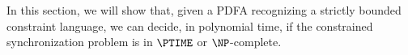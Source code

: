  In this section, we will show that, given a PDFA recognizing a strictly bounded
 constraint language, we can decide, in polynomial time, if
 the constrained synchronization problem is in $\PTIME$
 or $\NP$-complete.
\begin{comment}
 In Proposition~\ref{prop:stricly_bounded_np_hard}
 and in Proposition~\ref{prop:stricly_bounded_P}, it was assumed
 that the unary languages of the form $A_j^{(i)} \subseteq \{a_j\}^*$
 for $j \in \{1,\ldots, k\}$ and $i \in \{1,\ldots,n\}$
 where recognizable by automata with a single final state.
 In the $\NP$-hardness reduction, this assumption was actually used,
 but Proposition~\ref{prop:stricly_bounded_P} could also  
 reformulated and proved without it. In the decision procedure,
 we do not bother to compute such a form, but only any form like
 in Theorem~\ref{thm:bounded_regular_form} for strictly bounded languages.
 This is justified by the next result.
 
 \begin{lemma} %
 \label{lem:form_unitary_or_not}
  Let $\Sigma = \{a_1, \ldots, a_k\}$ be an alphabet of size $k$
  and $L \subseteq a_1^* \cdots a_k^*$.
  If we can write 
  \[
   L = \bigcup_{i=1}^n A_1^{(i)} \cdots A_k^{(i)}
  \]
  with regular, non-empty $A_j^{(i)} \subseteq \{a_j\}^*$
  for $j \in \{1,\ldots,k\}$ and $i \in \{1,\ldots,n\}$
  such that there exists ... prop
  
  then, we can also write in as aunion with single state
  
  The same holds for the condition formulated in Proposition~\ref{prop:stricly_bounded_P}.
 \end{lemma}
\begin{proof}
 Notation as in the statement.
 By Lemma~\ref{lem::unary_single_final}, we can write each
 $A_j^{(i)}$ as a finite union of regular languages recognizable
 by an automaton with a single final state.
 So, if any $A_j^{(i)}$ is infinite, at least one part of this
 union must also be finite, and the same if $A_j^{(i)} \ne  \{\varepsilon\}$.
 Then, rewriting by using that concatenation
 distributes over union, we have a form fulfilling the condition
 of Proposition~\ref{prop:stricly_bounded_np_hard}.
 The same reasoning applies to the condition
 formulated in Proposition~\ref{prop:stricly_bounded_P}.
\end{proof}
 
 
 Note a subtle issue here, and that is the reason why Lemma~\ref{lem:form_unitary_or_not} 
 actually comes up in this section.
 Given some automaton recognizing a strictly bounded language $L$,
 the form can be readily, and in polynomial time,
 $$
   L = \bigcup_{i=1}^n A_1^{(i)} \cdots A_k^{(i)}
 $$
 computed
\end{comment} 
 
